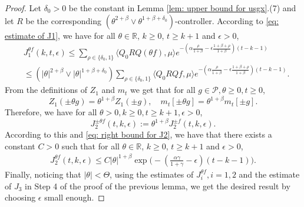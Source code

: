 \documentclass[12pt,a4paper]{amsart}
\theoremstyle{plain}
\theoremstyle{definition}
\numberwithin{equation}{section}
\begin{document}
\begin{proof}
    Let $\delta_0 >0$ be the constant in Lemma \ref{lem: upper bound for usgx}.(7) and let $R$ be the corresponding $(\theta^{2+\beta}\vee \theta^{1+\beta+\delta_0})$-controller.
	According to \eqref{eq: estimate of J1}, we have for all $\theta\in \mathbb R$, $k\geq 0$, $t\geq k+1$ and $\epsilon> 0$,
\begin{equation}\begin{split}
    &J^{\theta f}_1(k,t,\epsilon)
    \leq \sum_{\rho \in \{\delta_0,1\}} \langle Q_0 RQ(\theta f), \mu \rangle e^{-(\alpha\frac{\rho}{1+\beta}-\epsilon\frac{1+\beta+\rho}{1+\beta})(t-k-1)}
    \\& \leq(|\theta|^{2+\beta}\vee |\theta|^{1+\beta+\delta_0}) \sum_{\rho \in \{\delta_0,1\}} \langle Q_0 RQf, \mu \rangle e^{-(\alpha\frac{\rho}{1+\beta}-\epsilon\frac{1+\beta+\rho}{1+\beta})(t-k-1)}.
\end{split}\end{equation}
	From the definitions of $Z_1$ and $m_t$ we get that for all $g\in \mathcal P, \theta \geq 0, t\geq 0$,
\[
	Z_1( \pm \theta g) = \theta^{1+\beta} Z_1(\pm g), \quad m_t[\pm \theta g] = \theta^{1+\beta} m_t[\pm g].
\]
	Therefore, we have for all $\theta >0, k \geq 0, t\geq k+1, \epsilon > 0$,
\[
    J^{\pm \theta f}_2(t,k,\epsilon)
	:= \theta^{1+\beta} J_2^{\pm f}(t,k,\epsilon).
\]
	According to this and \eqref{eq: right bound for J2}, 
	we have that there exists a constant $C > 0$ such that for all $\theta\in \mathbb R$, $k\geq 0$, $t\geq k+1$ and $\epsilon> 0$,
\begin{equation}\begin{split}
\label{eq:31step3b}
    J^{\theta f}_2(t,k,\epsilon)
    \leq C |\theta|^{1+\beta}\exp\Big(-(\frac{\alpha\gamma}{1+\gamma}-\epsilon)(t-k-1)\Big).
\end{split}\end{equation}
	Finally, noticing that $|\theta| < \Theta$, using the estimates of $J^{\theta f}_{i}, i = 1,2$ and the estimate of $J_3$ in Step 4 of the proof of the previous lemma, we get the desired result by choosing $\epsilon$ small enough.
\end{proof}
\end{document}

